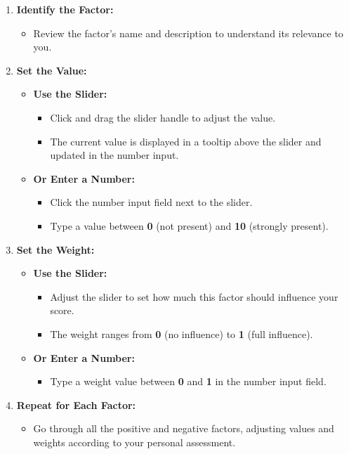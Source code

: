 \documentclass[11pt]{article}
\begin{document}
\begin{enumerate}
    \item \textbf{Identify the Factor:}
    \begin{itemize}
        \item Review the factor's name and description to understand its relevance to you.
    \end{itemize}
    \item \textbf{Set the Value:}
    \begin{itemize}
        \item \textbf{Use the Slider:}
        \begin{itemize}
            \item Click and drag the slider handle to adjust the value.
            \item The current value is displayed in a tooltip above the slider and updated in the number input.
        \end{itemize}
        \item \textbf{Or Enter a Number:}
        \begin{itemize}
            \item Click the number input field next to the slider.
            \item Type a value between \textbf{0} (not present) and \textbf{10} (strongly present).
        \end{itemize}
    \end{itemize}
    \item \textbf{Set the Weight:}
    \begin{itemize}
        \item \textbf{Use the Slider:}
        \begin{itemize}
            \item Adjust the slider to set how much this factor should influence your score.
            \item The weight ranges from \textbf{0} (no influence) to \textbf{1} (full influence).
        \end{itemize}
        \item \textbf{Or Enter a Number:}
        \begin{itemize}
            \item Type a weight value between \textbf{0} and \textbf{1} in the number input field.
        \end{itemize}
    \end{itemize}
    \item \textbf{Repeat for Each Factor:}
    \begin{itemize}
        \item Go through all the positive and negative factors, adjusting values and weights according to your personal assessment.
    \end{itemize}
\end{enumerate}
\end{document}
